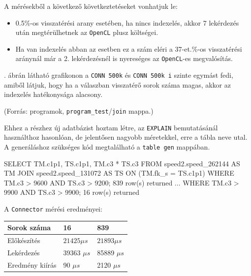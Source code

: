 A mérésekből a következő következtetéseket vonhatjuk le:
\begin{itemize}
	\item 0.5\%-os visszatérési arany esetében, ha nincs indexelés, akkor 7 lekérdezés után megtérülhetnek az \texttt{OpenCL} plusz költségei.
	\item Ha van indexelés abban az esetben ez a szám eléri a 37-et.\%-os visszatérési aránynál már a 2. lekérdezésnél is nyereséges az \texttt{OpenCL}-es megvalósítás. 
\end{itemize}

. ábrán látható grafikonon a \texttt{CONN 500k} és \texttt{CONN 500k i} szinte egymást fedi, amiből látjuk, hogy ha a válaszban visszatérő sorok száma magas, akkor az indexelés hatékonysága alacsony.

(Forrás: programok, \texttt{program\_test}/\texttt{join} mappa.)

Ehhez a részhez új adatbázist hoztam létre, az \texttt{EXPLAIN} bemutatásánál használthoz hasonlóan, de jelentősen nagyobb méretekkel, erre a tábla neve utal.
A generáláshoz szükséges kód megtalálható a \texttt{table gen} mappában.

\begin{python}
SELECT TM.c1p1, TS.c1p1, TM.c3 * TS.c3
FROM speed2.speed_262144 AS TM 
JOIN speed2.speed_131072 AS TS ON (TM.fk_s = TS.c1p1) 
WHERE TM.c3 > 9600 AND TS.c3 > 9200; 
	839 row(s) returned
...
WHERE TM.c3 > 9900 AND TS.c3 > 9900; 
	16 row(s) returned
\end{python}

A \texttt{Connector} mérési eredményei:

\begin{table}[h!]
\centering
\begin{tabular}{|p{6cm}|p{3cm}|p{3cm}|}
\hline
Sorok száma & 16 & 839 \\
\hline\hline

Előkészítés & $21425 \mu s$ & $21893 \mu s$ \\
\hline

Lekérdezés & 39363 $\mu s$ & 85889 $\mu s$ \\
\hline

Eredmény kiírás & 90 $\mu s$ & 2120 $\mu s$ \\
\hline

\end{tabular}
\end{table}

